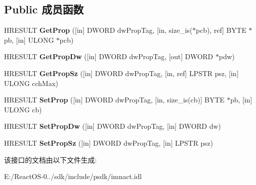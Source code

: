 \subsection*{Public 成员函数}
\begin{DoxyCompactItemize}
\item 
\mbox{\label{interface_i_property_container_af88277937333eb1ec13ff01ca14f29b0}} 
H\+R\+E\+S\+U\+LT {\bfseries Get\+Prop} (\mbox{[}in\mbox{]} D\+W\+O\+RD dw\+Prop\+Tag, \mbox{[}in, size\+\_\+is($\ast$pcb), ref\mbox{]} B\+Y\+TE $\ast$pb, \mbox{[}in\mbox{]} U\+L\+O\+NG $\ast$pcb)
\item 
\mbox{\label{interface_i_property_container_aa52bc3337bbb9df154a753e455f30a48}} 
H\+R\+E\+S\+U\+LT {\bfseries Get\+Prop\+Dw} (\mbox{[}in\mbox{]} D\+W\+O\+RD dw\+Prop\+Tag, \mbox{[}out\mbox{]} D\+W\+O\+RD $\ast$pdw)
\item 
\mbox{\label{interface_i_property_container_a3d2f828488fce57624366539e8799dd3}} 
H\+R\+E\+S\+U\+LT {\bfseries Get\+Prop\+Sz} (\mbox{[}in\mbox{]} D\+W\+O\+RD dw\+Prop\+Tag, \mbox{[}in, ref\mbox{]} L\+P\+S\+TR psz, \mbox{[}in\mbox{]} U\+L\+O\+NG cch\+Max)
\item 
\mbox{\label{interface_i_property_container_adc6ac624c4692077c69334e1d265abf7}} 
H\+R\+E\+S\+U\+LT {\bfseries Set\+Prop} (\mbox{[}in\mbox{]} D\+W\+O\+RD dw\+Prop\+Tag, \mbox{[}in, size\+\_\+is(cb)\mbox{]} B\+Y\+TE $\ast$pb, \mbox{[}in\mbox{]} U\+L\+O\+NG cb)
\item 
\mbox{\label{interface_i_property_container_aeb234552d57cede0db93caddf9f225c5}} 
H\+R\+E\+S\+U\+LT {\bfseries Set\+Prop\+Dw} (\mbox{[}in\mbox{]} D\+W\+O\+RD dw\+Prop\+Tag, \mbox{[}in\mbox{]} D\+W\+O\+RD dw)
\item 
\mbox{\label{interface_i_property_container_a8d53009dc19e8a4a48161cf0a85ef83c}} 
H\+R\+E\+S\+U\+LT {\bfseries Set\+Prop\+Sz} (\mbox{[}in\mbox{]} D\+W\+O\+RD dw\+Prop\+Tag, \mbox{[}in\mbox{]} L\+P\+S\+TR psz)
\end{DoxyCompactItemize}


该接口的文档由以下文件生成\+:\begin{DoxyCompactItemize}
\item 
E\+:/\+React\+O\+S-\/0../sdk/include/psdk/imnact.\+idl\end{DoxyCompactItemize}
